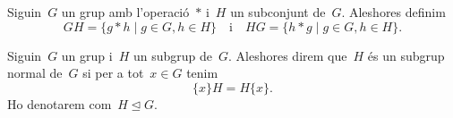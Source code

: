 \documentclass[../../main.tex]{subfiles}
\begin{document}
    \begin{definition}
        \label{def:conjugació entre conjunts sobre grups}
        Siguin~\(G\) un grup amb l'operació~\(\ast\) i~\(H\) un subconjunt de~\(G\).
        Aleshores definim
        \[
            GH=\{g\ast h\mid g\in G,h\in H\}\quad\text{i}\quad HG=\{h\ast g\mid g\in G,h\in H\}.
        \]
    \end{definition}
    \begin{definition}
        \label{def:subgrup normal}
        Siguin~\(G\) un grup i~\(H\) un subgrup de~\(G\).
        Aleshores direm que~\(H\) és un subgrup normal de~\(G\) si per a tot~\(x\in G\) tenim
        \[
            \{x\}H=H\{x\}.
        \]
        Ho denotarem com~\(H\trianglelefteq G\).
    \end{definition}
\end{document}
